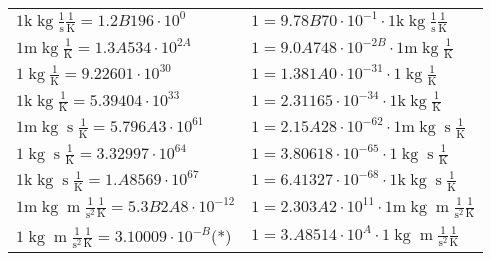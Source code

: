 \begin{center}
\begin{longtable}{l l}
{\color{gray}$1 \bm{\mathrm{ k}}\operatorname{kg}{}\frac1{\operatorname{s}}{}\frac1{\operatorname{K}} = 1.2B196\cdot10^{0} $}   & {\color{gray}$ 1 = 9.78B70\cdot10^{-1} \cdot 1 \bm{\mathrm{ k}}\operatorname{kg}{}\frac1{\operatorname{s}}{}\frac1{\operatorname{K}}$}  \\
{\color{gray}$1 \bm{\mathrm{ m}}\operatorname{kg}{}{}{}\frac1{\operatorname{K}} = 1.3A534\cdot10^{2A} $}   & {\color{gray}$ 1 = 9.0A748\cdot10^{-2B} \cdot 1 \bm{\mathrm{ m}}\operatorname{kg}{}{}{}\frac1{\operatorname{K}}$}  \\
{\color{black}$1 \bm{\mathrm{ }}\operatorname{kg}{}{}{}\frac1{\operatorname{K}} = 9.22601\cdot10^{30} $}   & {\color{black}$ 1 = 1.381A0\cdot10^{-31} \cdot 1 \bm{\mathrm{ }}\operatorname{kg}{}{}{}\frac1{\operatorname{K}}$}  \\
{\color{gray}$1 \bm{\mathrm{ k}}\operatorname{kg}{}{}{}\frac1{\operatorname{K}} = 5.39404\cdot10^{33} $}   & {\color{gray}$ 1 = 2.31165\cdot10^{-34} \cdot 1 \bm{\mathrm{ k}}\operatorname{kg}{}{}{}\frac1{\operatorname{K}}$}  \\
{\color{gray}$1 \bm{\mathrm{ m}}\operatorname{kg}{}{\operatorname{s}}{}\frac1{\operatorname{K}} = 5.796A3\cdot10^{61} $}   & {\color{gray}$ 1 = 2.15A28\cdot10^{-62} \cdot 1 \bm{\mathrm{ m}}\operatorname{kg}{}{\operatorname{s}}{}\frac1{\operatorname{K}}$}  \\
{\color{black}$1 \bm{\mathrm{ }}\operatorname{kg}{}{\operatorname{s}}{}\frac1{\operatorname{K}} = 3.32997\cdot10^{64} $}   & {\color{black}$ 1 = 3.80618\cdot10^{-65} \cdot 1 \bm{\mathrm{ }}\operatorname{kg}{}{\operatorname{s}}{}\frac1{\operatorname{K}}$}  \\
{\color{gray}$1 \bm{\mathrm{ k}}\operatorname{kg}{}{\operatorname{s}}{}\frac1{\operatorname{K}} = 1.A8569\cdot10^{67} $}   & {\color{gray}$ 1 = 6.41327\cdot10^{-68} \cdot 1 \bm{\mathrm{ k}}\operatorname{kg}{}{\operatorname{s}}{}\frac1{\operatorname{K}}$}  \\
{\color{gray}$1 \bm{\mathrm{ m}}\operatorname{kg}{\operatorname{m}}\frac1{\operatorname{s}^2}{}\frac1{\operatorname{K}} = 5.3B2A8\cdot10^{-12} $}   & {\color{gray}$ 1 = 2.303A2\cdot10^{11} \cdot 1 \bm{\mathrm{ m}}\operatorname{kg}{\operatorname{m}}\frac1{\operatorname{s}^2}{}\frac1{\operatorname{K}}$}  \\
{\color{black}$1 \bm{\mathrm{ }}\operatorname{kg}{\operatorname{m}}\frac1{\operatorname{s}^2}{}\frac1{\operatorname{K}} = 3.10009\cdot10^{-B} $}\quad(*) & {\color{black}$ 1 = 3.A8514\cdot10^{A} \cdot 1 \bm{\mathrm{ }}\operatorname{kg}{\operatorname{m}}\frac1{\operatorname{s}^2}{}\frac1{\operatorname{K}}$}  \\

\end{longtable}
\end{center}
